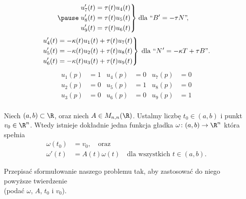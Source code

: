 \begin{frame}[<+->]
\begin{align*}
\pause\left.\begin{aligned}      
u_7'(t)&=\tau(t)u_4(t)\\
u_8'(t)&=\tau(t)u_5(t)\\
u_9'(t)&=\tau(t)u_6(t)
\end{aligned}\right\}&\;\text{dla }``B'=-\tau N\text{''}\!,
\end{align*}
\vspace*{-0.1in}
\pause\begin{equation*}
\left.\begin{aligned}      
u_4'(t)&=-\kappa(t)u_1(t)+\tau(t)u_7(t)\\
u_5'(t)&=-\kappa(t)u_2(t)+\tau(t)u_8(t)\\
u_6'(t)&=-\kappa(t)u_3(t)+\tau(t)u_9(t)
\end{aligned}\right\}\;\text{dla }``N\hspace{0.5pt}'=-\kappa T+\tau B\text{''}.
\end{equation*}
\vspace*{-0.2in}
\pause \begin{align*}
u_1(p)&=1 & u_4(p)&=0 & u_7(p)&=0\\ 
u_2(p)&=0 & u_5(p)&=1 & u_8(p)&=0\\
u_3(p)&=0 & u_6(p)&=0 & u_9(p)&=1\\ 
 \end{align*}

\end{frame}
\begin{frame}[<+->]
\begin{twierdzenie}\label{thm:dif-eq-solution}
Niech $(a,b)\subset \R$, oraz  niech $A\in M_{n,n}(\R)$.  Ustalmy liczbę $t_0\in 
(a,b)$ i punkt $v_0\in \R^n$. Wtedy istnieje dokładnie jedna funkcja gładka 
$\omega\colon (a,b)\to \R^n$ która spełnia 
\begin{align*}
\omega(t_0)&=v_0,\quad\text{oraz}\\
\omega'(t)&=A(t)\omega(t) \quad\text{dla wszystkich }t\in (a,b).
\end{align*}
\end{twierdzenie}

\begin{exercise}
Przepisać sformułowanie naszego problemu tak, aby zastosować do niego powyższe 
twierdzenie \\(podać $\omega$, $A$, $t_0$ i $v_0$). 
\end{exercise}

\end{frame}
